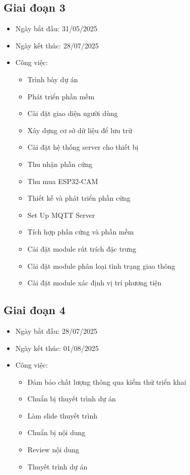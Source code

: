 \subsection{Giai đoạn 3}
\begin{itemize}
    \item Ngày bắt đầu: 31/05/2025
    \item Ngày kết thúc: 28/07/2025
    \item Công việc:
    \begin{itemize}
        \item Trình bày dự án
        \item Phát triển phần mềm
        \item Cài đặt giao diện người dùng
        \item Xây dựng cơ sở dữ liệu để lưu trữ
        \item Cài đặt hệ thống server cho thiết bị
        \item Thu nhận phần cứng
        \item Thu mua ESP32-CAM
        \item Thiết kế và phát triển phần cứng
        \item Set Up MQTT Server
        \item Tích hợp phần cứng và phần mềm 
        \item Cài đặt module rút trích đặc trưng
        \item Cài đặt module phân loại tình trạng giao thông
        \item Cài đặt module xác định vị trí phương tiện
    \end{itemize}
\end{itemize}

\subsection{Giai đoạn 4}
\begin{itemize}
    \item Ngày bắt đầu: 28/07/2025
    \item Ngày kết thúc: 01/08/2025
    \item Công việc:
    \begin{itemize}
        \item Đảm bảo chất lượng thông qua kiểm thử triển khai
        \item Chuẩn bị thuyết trình dự án
        \item Làm slide thuyết trình
        \item Chuẩn bị nội dung
        \item Review nội dung 
        \item Thuyết trình dự án
    \end{itemize}
\end{itemize}












